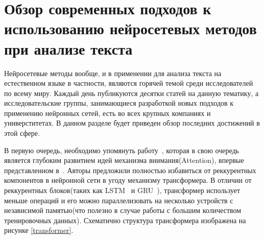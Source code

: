 \section{Обзор современных подходов к использованию нейросетевых методов при анализе текста} \label{literature}

\par Нейросетевые методы вообще, и в применении для анализа текста на естественном языке в частности, являются горячей темой среди исследователей по всему миру. Каждый день публикуются десятки статей на данную тематику, а исследовательские группы, занимающиеся разработкой новых подходов к применению нейронных сетей, есть во всех крупных компаниях и универститетах. В данном разделе будет приведен обзор последних достижений в этой сфере.

\par В первую очередь, необходимо упомянуть работу~\cite{attn-all-need}, которая в свою очередь является глубоким развитием идей механизма внимания(Attention), впервые представленном в~\cite{attn-original}. Авторы предложили полностью избавиться от реккурентных компонентов в нейронной сети в угоду механизму трансформера. В отличии от реккурентных блоков(таких как LSTM~\cite{lstm} и GRU~\cite{gru}), трансформер использует меньше операций и его можно параллелизовать на несколько устройств с независимой памятью(что полезно в случае работы с большим количеством тренировочных данных). Схематично структура трансформера изображена на рисунке \ref{transformer}.


